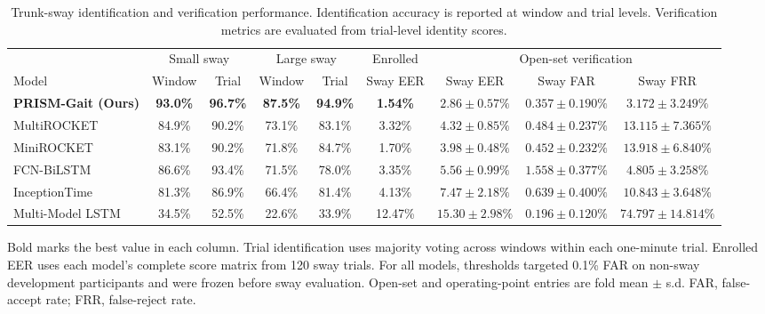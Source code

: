 \begin{table}[t]
\caption{Trunk-sway identification and verification performance. Identification accuracy is reported at window and trial levels. Verification metrics are evaluated from trial-level identity scores.}
\label{tab:verification_operating_points}
\centering
\small
\setlength{\tabcolsep}{3.5pt}
\renewcommand{\arraystretch}{1.16}
\begin{adjustbox}{max width=\textwidth}
\begin{tabular}{lcccccccc}
\toprule
& \multicolumn{2}{c}{Small sway} & \multicolumn{2}{c}{Large sway} & Enrolled & \multicolumn{3}{c}{Open-set verification} \\
\cmidrule(lr){2-3}\cmidrule(lr){4-5}\cmidrule(lr){7-9}
Model & Window & Trial & Window & Trial & Sway EER & Sway EER & Sway FAR & Sway FRR \\
\midrule
\textbf{PRISM-Gait (Ours)} & \textbf{93.0\%} & \textbf{96.7\%} & \textbf{87.5\%} & \textbf{94.9\%} & \textbf{1.54\%} & $\mathbf{2.86\pm0.57}\%$ & $0.357\pm0.190\%$ & $\mathbf{3.172\pm3.249}\%$ \\
MultiROCKET & 84.9\% & 90.2\% & 73.1\% & 83.1\% & 3.32\% & $4.32\pm0.85\%$ & $0.484\pm0.237\%$ & $13.115\pm7.365\%$ \\
MiniROCKET & 83.1\% & 90.2\% & 71.8\% & 84.7\% & 1.70\% & $3.98\pm0.48\%$ & $0.452\pm0.232\%$ & $13.918\pm6.840\%$ \\
FCN-BiLSTM & 86.6\% & 93.4\% & 71.5\% & 78.0\% & 3.35\% & $5.56\pm0.99\%$ & $1.558\pm0.377\%$ & $4.805\pm3.258\%$ \\
InceptionTime & 81.3\% & 86.9\% & 66.4\% & 81.4\% & 4.13\% & $7.47\pm2.18\%$ & $0.639\pm0.400\%$ & $10.843\pm3.648\%$ \\
Multi-Model LSTM & 34.5\% & 52.5\% & 22.6\% & 33.9\% & 12.47\% & $15.30\pm2.98\%$ & $\mathbf{0.196\pm0.120}\%$ & $74.797\pm14.814\%$ \\
\bottomrule
\end{tabular}
\end{adjustbox}
\vspace{2pt}
\parbox{0.98\textwidth}{\footnotesize Bold marks the best value in each column. Trial identification uses majority voting across windows within each one-minute trial. Enrolled EER uses each model's complete score matrix from 120 sway trials. For all models, thresholds targeted 0.1\% FAR on non-sway development participants and were frozen before sway evaluation. Open-set and operating-point entries are fold mean $\pm$ s.d. FAR, false-accept rate; FRR, false-reject rate.}
\end{table}
